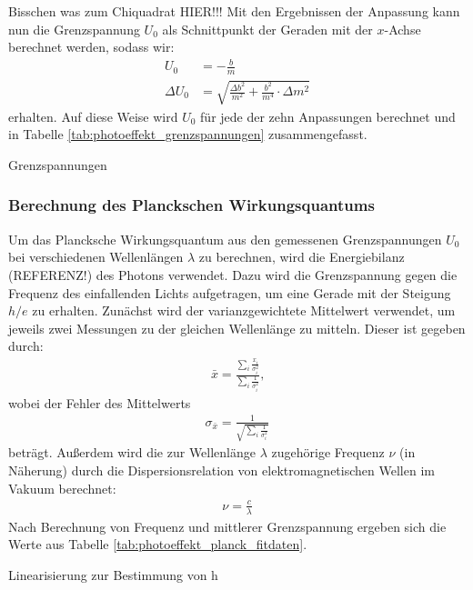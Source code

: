 \documentclass[11pt, a4paper]{article}
\numberwithin{equation}{section}
\begin{document}
Bisschen was zum Chiquadrat HIER!!!
Mit den Ergebnissen der Anpassung kann nun die Grenzspannung $U_0$ als Schnittpunkt der Geraden mit der $x$-Achse berechnet werden, sodass wir:
\begin{align*}
	U_0 &= -\frac{b}{m} \\
	\Delta U_0 &= \sqrt{\frac{\Delta b^2}{m^2} + \frac{b^2}{m^4}\cdot \Delta m^2}
\end{align*}
erhalten.
Auf diese Weise wird $U_0$ für jede der zehn Anpassungen berechnet und in Tabelle \ref{tab:photoeffekt_grenzspannungen} zusammengefasst.
\begin{table}[h]
	\centering
	
	\caption{Grenzspannungen}
	\label{tab:photoeffekt_grenzspannungen}
\end{table}

\subsubsection{Berechnung des Planckschen Wirkungsquantums}
Um das Plancksche Wirkungsquantum aus den gemessenen Grenzspannungen $U_0$ bei verschiedenen Wellenlängen $\lambda$ zu berechnen, wird die Energiebilanz (REFERENZ!) des Photons verwendet.
Dazu wird die Grenzspannung gegen die Frequenz des einfallenden Lichts aufgetragen, um eine Gerade mit der Steigung $h/e$ zu erhalten.
Zunächst wird der varianzgewichtete Mittelwert verwendet, um jeweils zwei Messungen zu der gleichen Wellenlänge zu mitteln.
Dieser ist gegeben durch:
\begin{align*}
\bar{x} = \frac{\sum_i \frac{x_i}{\sigma_i^2}}{\sum_i \frac{1}{\sigma_i^2}}\text{,}
\end{align*}
wobei der Fehler des Mittelwerts
\begin{align*}
\sigma_{\bar{x}} = \frac{1}{\sqrt{\sum_i \frac{1}{\sigma_i^2}}}
\end{align*}
beträgt.
Außerdem wird die zur Wellenlänge $\lambda$ zugehörige Frequenz $\nu$ (in Näherung) durch die Dispersionsrelation von elektromagnetischen Wellen im Vakuum berechnet:
\begin{align*}
	\nu = \frac{c}{\lambda}
\end{align*}
Nach Berechnung von Frequenz und mittlerer Grenzspannung ergeben sich die Werte aus Tabelle \ref{tab:photoeffekt_planck_fitdaten}.
\begin{table}[h]
	\centering
	
	\caption{Linearisierung zur Bestimmung von h}
	\label{tab:photoeffekt_planck_fitdaten}
\end{table}
\end{document}
